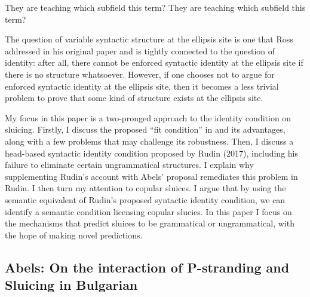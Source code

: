 \documentclass{turabian-researchpaper}
\begin{document}
\begin{exe}
\ex\label{whichsubfield}
\begin{xlist}
\ex They are teaching which subfield this term? 
\ex They are teaching which subfield this term? 
\end{xlist}
\end{exe}

The question of variable syntactic structure at the ellipsis site is one that Ross addressed in his original paper and is tightly connected to the question of identity: after all, there cannot be enforced syntactic identity at the ellipsis site if there is no structure whatsoever. However, if one chooses not to argue for enforced syntactic identity at the ellipsis site, then it becomes a less trivial problem to prove that some kind of structure exists at the ellipsis site. 

My focus in this paper is a two-pronged approach to the identity condition on sluicing. 
Firstly, I discuss the proposed ``fit condition'' in \citet{abelsfitcondition} and its advantages, along with a few problems that may challenge its robustness. Then, I discuss a head-based syntactic identity condition proposed by Rudin (2017), including his failure to eliminate certain ungrammatical structures. I explain why supplementing Rudin's account with Abels' proposal remediates this problem in Rudin. I then turn my attention to copular sluices. I argue that by using the semantic equivalent of Rudin's proposed syntactic identity condition, we can identify a semantic condition licensing copular slucies. In this paper I focus on the mechanisms that predict sluices to be grammatical or ungrammatical, with the hope of making novel predictions.  

\subsection{Abels: On the interaction of P-stranding and Sluicing in Bulgarian} 
\end{document}
